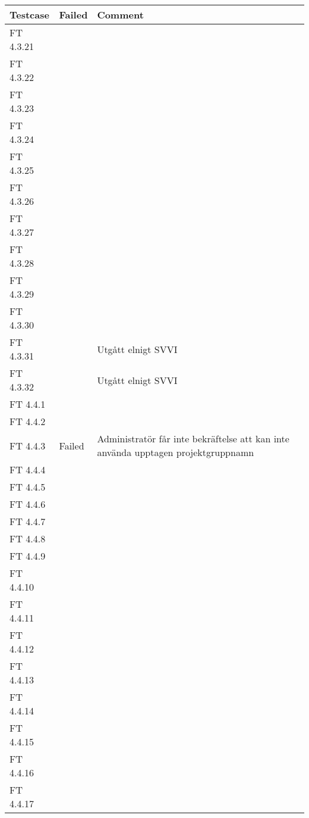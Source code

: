 \documentclass[a4paper]{article}
\begin{document}
\begin{tabular}{| l | l | p{11cm} |}
\hline
Testcase &  Failed & Comment\\
\hline
FT 4.3.21 & & \\
\hline
FT 4.3.22 & & \\
\hline
FT 4.3.23 & & \\
\hline
FT 4.3.24 & & \\
\hline
FT 4.3.25 & & \\
\hline
FT 4.3.26 & & \\
\hline
FT 4.3.27 & & \\
\hline
FT 4.3.28 & & \\
\hline
FT 4.3.29 & & \\
\hline
FT 4.3.30 & & \\
\hline
FT 4.3.31 & & Utgått elnigt SVVI\\
\hline
FT 4.3.32 & & Utgått elnigt SVVI\\
\hline
FT 4.4.1 & & \\
\hline
FT 4.4.2 & & \\
\hline
FT 4.4.3 & Failed & Administratör får inte bekräftelse att kan inte använda upptagen projektgruppnamn \\
\hline
FT 4.4.4 & & \\
\hline
FT 4.4.5 & & \\
\hline
FT 4.4.6 & & \\
\hline
FT 4.4.7 & & \\
\hline
FT 4.4.8 & & \\
\hline
FT 4.4.9 & & \\
\hline
FT 4.4.10 & & \\
\hline
FT 4.4.11 & & \\
\hline
FT 4.4.12 & & \\
\hline
FT 4.4.13 & & \\
\hline
FT 4.4.14 & & \\
\hline
FT 4.4.15 & & \\
\hline
FT 4.4.16 & & \\
\hline
FT 4.4.17 & & \\
\hline
\end{tabular}
\end{document}
